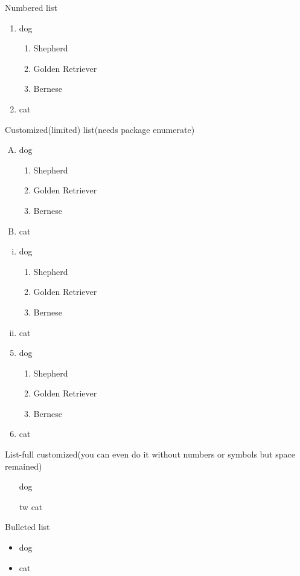\documentclass[11pt]{article}
\begin{document}
Numbered list
\begin{enumerate}
\item dog
	\begin{enumerate}
	\item Shepherd
	\item Golden Retriever
	\item Bernese
	\end{enumerate}
\item cat
\end{enumerate}

Customized(limited) list(needs package enumerate)
\begin{enumerate}[A.]
\item dog
	\begin{enumerate}
	\item Shepherd
	\item Golden Retriever
	\item Bernese
	\end{enumerate}
\item cat
\end{enumerate}
\begin{enumerate}[i.]
\item dog
	\begin{enumerate}
	\item Shepherd
	\item Golden Retriever
	\item Bernese
	\end{enumerate}
\item cat
\end{enumerate}
\begin{enumerate} \setcounter{enumi}{4}
\item dog
	\begin{enumerate}
	\item Shepherd
	\item Golden Retriever
	\item Bernese
	\end{enumerate}
\item cat
\end{enumerate}

List-full customized(you can even do it without numbers or symbols but space remained)
\begin{enumerate}
\item[] dog
\item[tw] cat
\end{enumerate}

Bulleted list
\begin{itemize}
\item dog
\item cat
\end{itemize}
\end{document}
